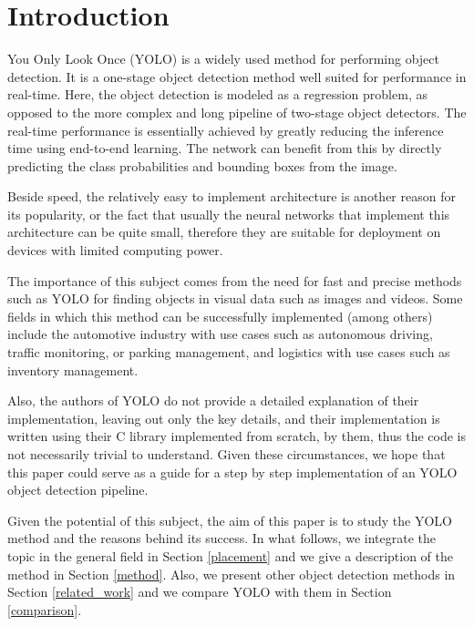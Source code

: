 \section{Introduction}\label{introduction}

You Only Look Once (YOLO) \cite{yolo} is a widely used method for performing object detection. It is a one-stage object detection method well suited for performance in real-time. Here, the object detection is modeled as a regression problem, as opposed to the more complex and long pipeline of two-stage object detectors. The real-time performance is essentially achieved by greatly reducing the inference time using end-to-end learning. The network can benefit from this by directly predicting the class probabilities and bounding boxes from the image.
        
Beside speed, the relatively easy to implement architecture is another reason for its popularity, or the fact that usually the neural networks that implement this architecture can be quite small, therefore they are suitable for deployment on devices with limited computing power. 

The importance of this subject comes from the need for fast and precise methods such as YOLO for finding objects in visual data such as images and videos. Some fields in which this method can be successfully implemented (among others) include the automotive industry with use cases such as autonomous driving, traffic monitoring, or parking management, and logistics with use cases such as inventory management. 

Also, the authors of YOLO do not provide a detailed explanation of their implementation, leaving out only the key details, and their implementation is written using their C library implemented from scratch, by them, thus the code is not necessarily trivial to understand. Given these circumstances, we hope that this paper could serve as a guide for a step by step implementation of an YOLO object detection pipeline. 

Given the potential of this subject, the aim of this paper is to study the YOLO method and the reasons behind its success. In what follows, we integrate the topic in the general field in Section \ref{placement} and we give a description of the method in Section \ref{method}. Also, we present other object detection methods in Section \ref{related_work} and we compare YOLO with them in Section \ref{comparison}.


